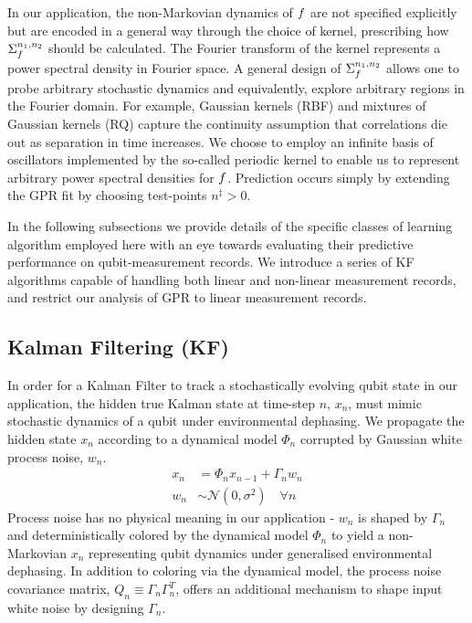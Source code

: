 In our application, the non-Markovian dynamics of $f$ are not specified explicitly but are encoded in a general way through the choice of kernel, prescribing how $\Sigma_f^{n_1, n_2}$ should be calculated. The Fourier transform of the kernel represents a power spectral density in Fourier space. A general design of $\Sigma_f^{n_1, n_2}$ allows one to probe arbitrary stochastic dynamics and equivalently, explore arbitrary regions in the Fourier domain. For example, Gaussian kernels (RBF) and mixtures of Gaussian kernels (RQ) capture the continuity assumption that correlations die out as separation in time increases. We choose to employ an infinite basis of oscillators implemented by the so-called periodic kernel to enable us to represent arbitrary power spectral densities for $f$.  Prediction occurs simply by extending the GPR fit by choosing test-points $n^{\ddagger}>0$.

In the following subsections we provide details of the specific classes of learning algorithm employed here with an eye towards evaluating their predictive performance on qubit-measurement records.  We introduce a series of KF algorithms capable of handling both linear and non-linear measurement records, and restrict our analysis of GPR to linear measurement records. 



\subsection{ Kalman Filtering (KF)}\label{Subsec:KF}

In order for a Kalman Filter to track a stochastically evolving qubit state in our application, the hidden true Kalman state at time-step $n$, $x_n$, must mimic stochastic dynamics of a qubit under environmental dephasing. We propagate the hidden state $x_n$ according to a dynamical model $\Phi_n$ corrupted by Gaussian white process noise, $w_n$.  
\begin{align}
x_n & = \Phi_n x_{n-1} + \Gamma_n w_n \label{eqn:KF:dynamics} \\
w_n & \sim \mathcal{N}(0, \sigma^2) \quad \forall n 
\end{align}
Process noise has no physical meaning in our application - $w_n$ is shaped by $\Gamma_n$ and deterministically colored by the dynamical model $\Phi_n$ to yield a non-Markovian $x_n$ representing qubit dynamics under generalised environmental dephasing. In addition to coloring via the dynamical model, the process noise covariance matrix, $Q_n \equiv \Gamma_n\Gamma_n^T $, offers an additional mechanism to shape input white noise by designing $\Gamma_n$.


